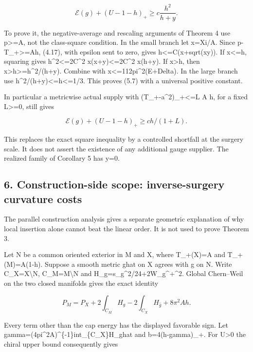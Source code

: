 \documentclass[
  10pt,
]{article}
\begin{document}
\[
 \boxed{\mathcal E(g)+(U-1-h)_+\ge c\frac{h^2}{h+y}.} \tag{5.7}
\]

To prove it, the negative-average and rescaling arguments of Theorem 4
use p\textgreater=A, not the class-square condition. In the small branch
let x=Xi/A. Since p-T\_+\textgreater=Ah, (4.17), with epsilon sent to
zero, gives h\textless=C(x+sqrt(xy)). If x\textless=h, squaring gives
h\^{}2\textless=2C\^{}2 x(x+y)\textless=2C\^{}2 x(h+y). If
x\textgreater h, then x\textgreater h\textgreater=h\^{}2/(h+y). Combine
with x\textless=112pi\^{}2(E+Delta). In the large branch use
h\^{}2/(h+y)\textless=h\textless=1/3. This proves (5.7) with a universal
positive constant.

In particular a metricwise actual supply with
(T\_+-a\^{}2)\_+\textless=L A h, for a fixed L\textgreater=0, still
gives

\[
               \mathcal E(g)+(U-1-h)_+\ge c h/(1+L). \tag{5.8}
\]

This replaces the exact square inequality by a controlled shortfall at
the surgery scale. It does not assert the existence of any additional
gauge supplier. The realized family of Corollary 5 has y=0.

\hypertarget{construction-side-scope-inverse-surgery-curvature-costs}{%
\subsection{6. Construction-side scope: inverse-surgery curvature
costs}\label{construction-side-scope-inverse-surgery-curvature-costs}}

The parallel construction analysis gives a separate geometric
explanation of why local insertion alone cannot beat the linear order.
It is not used to prove Theorem 3.

Let N be a common oriented exterior in M and X, where T\_+(X)=A and
T\_+(M)=A(1-h). Suppose a smooth metric ghat on X agrees with g on N.
Write C\_X=X\textbackslash N, C\_M=M\textbackslash N and
H\_g=s\_g\^{}2/24+2\textbar W\_g\^{}+\textbar\^{}2. Global Chern--Weil
on the two closed manifolds gives the exact identity

\[
 P_M=P_X+2\int_{C_M}H_g-2\int_{C_X}H_{\widehat g}
                              +8\pi^2Ah.             \tag{6.1}
\]

Every term other than the cap energy has the displayed favorable sign.
Let gamma=(4pi\^{}2A)\^{}\{-1\}int\_\{C\_X\}H\_ghat and b=4(h-gamma)\_+.
For U\textgreater0 the chiral upper bound consequently gives
\end{document}
